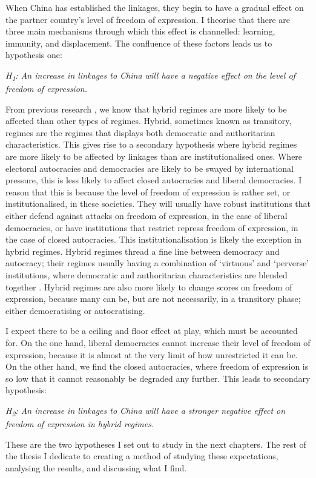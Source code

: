 When China has established the linkages, they begin to have a gradual effect on the partner country's level of freedom of expression. I theorise that there are three main mechanisms through which this effect is channelled: learning, immunity, and displacement. The confluence of these factors leads us to hypothesis one:
\begin{displayquote}
    \textit{H\textsubscript{1}: An increase in linkages to China will have a negative effect on the level of freedom of expression.}  
\end{displayquote}

From previous research \citep{toettoe_foreign_2023}, we know that hybrid regimes are more likely to be affected than other types of regimes. Hybrid, sometimes known as transitory, regimes are the regimes that displays both democratic and authoritarian characteristics. This gives rise to a secondary hypothesis where hybrid regimes are more likely to be affected by linkages than are institutionalised ones. Where electoral autocracies and democracies are likely to be swayed by international pressure, this is less likely to affect closed autocracies and liberal democracies. I reason that this is because the level of freedom of expression is rather set, or institutionalised, in these societies. They will usually have robust institutions that either defend against attacks on freedom of expression, in the case of liberal democracies, or have institutions that restrict repress freedom of expression, in the case of closed autocracies. This institutionalisation is likely the exception in hybrid regimes. Hybrid regimes thread a fine line between democracy and autocracy; their regimes usually having a combination of `virtuous' and `perverse' institutions, where democratic and authoritarian characteristics are blended together \citep{valenzuela_democratic_1990}. Hybrid regimes are also more likely to change scores on freedom of expression, because many can be, but are not necessarily, in a transitory phase; either democratising or autocratising.

I expect there to be a ceiling and floor effect at play, which must be accounted for. On the one hand, liberal democracies cannot increase their level of freedom of expression, because it is almost at the very limit of how unrestricted it can be. On the other hand, we find the closed autocracies, where freedom of expression is so low that it cannot reasonably be degraded any further. This leads to secondary hypothesis:
\begin{displayquote}
    \textit{H\textsubscript{2}: An increase in linkages to China will have a stronger negative effect on freedom of expression in hybrid regimes.}
\end{displayquote}

These are the two hypotheses I set out to study in the next chapters. The rest of the thesis I dedicate to creating a method of studying these expectations, analysing the results, and discussing what I find. 